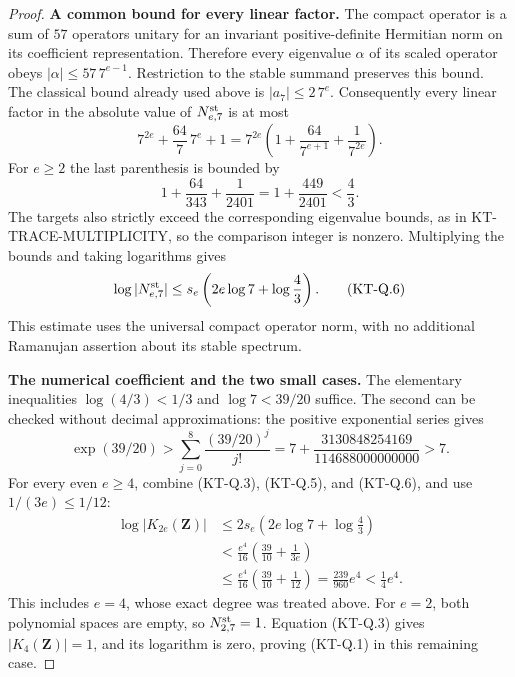 \documentclass[11pt,a4paper]{article}
\theoremstyle{definition}
\renewcommand{\paragraph}[1]{\par\smallskip\noindent\textbf{#1}\quad\ignorespaces}
\begin{document}
\begin{proof}
\paragraph{A common bound for every linear factor.}
The compact operator is a sum of $57$ operators unitary for
an invariant positive-definite Hermitian norm on its
coefficient representation.  Therefore every eigenvalue
$\alpha$ of its scaled operator obeys
$|\alpha|\leq57\,7^{e-1}$.  Restriction to the stable
summand preserves this bound.  The classical bound already
used above is $|a_7|\leq2\,7^e$.  Consequently every linear
factor in the absolute value of $N^{\rm st}_{e,7}$ is at most
\[
 7^{2e}+\frac{64}{7}\,7^e+1
   =7^{2e}\left(1+\frac{64}{7^{e+1}}+\frac1{7^{2e}}\right).
\]
For $e\geq2$ the last parenthesis is bounded by
\[
       1+\frac{64}{343}+\frac1{2401}
       =1+\frac{449}{2401}<\frac43.
\]
The targets also strictly exceed the corresponding eigenvalue
bounds, as in KT-TRACE-MULTIPLICITY, so the comparison integer
is nonzero.  Multiplying the bounds and taking logarithms gives
\[
      \log|N^{\rm st}_{e,7}|
       \leq s_e\left(2e\log7+\log\frac43\right).       \tag{KT-Q.6}
\]
This estimate uses the universal compact operator norm, with
no additional Ramanujan assertion about its stable spectrum.

\paragraph{The numerical coefficient and the two small cases.}
The elementary inequalities
$\log(4/3)<1/3$ and $\log7<39/20$ suffice.  The second can
be checked without decimal approximations: the positive
exponential series gives
\[
 \exp(39/20)>\sum_{j=0}^{8}\frac{(39/20)^j}{j!}
    =7+\frac{3130848254169}{114688000000000}>7.
\]
For every even $e\geq4$, combine (KT-Q.3), (KT-Q.5), and
(KT-Q.6), and use $1/(3e)\leq1/12$:
\[
 \begin{aligned}
 \log|K_{2e}(\mathbf Z)|
 &\leq2s_e\left(2e\log7+\log\frac43\right)\\
 &<\frac{e^4}{16}\left(\frac{39}{10}+\frac1{3e}\right)\\
 &\leq\frac{e^4}{16}\left(\frac{39}{10}+\frac1{12}\right)
   =\frac{239}{960}e^4<\frac14e^4.
 \end{aligned}
\]
This includes $e=4$, whose exact degree was treated above.
For $e=2$, both polynomial spaces are empty, so
$N^{\rm st}_{2,7}=1$.  Equation (KT-Q.3) gives
$|K_4(\mathbf Z)|=1$, and its logarithm is zero, proving
(KT-Q.1) in this remaining case.
\end{proof}
\end{document}
